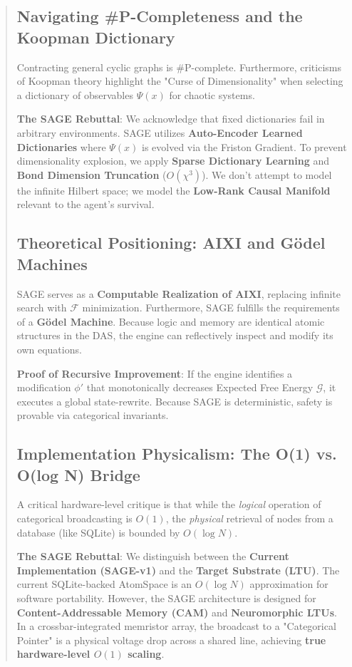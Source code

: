 \documentclass[10pt,twocolumn,letterpaper]{article}
\begin{document}
\begin{abstract}
\subsection{Navigating #P-Completeness and the Koopman Dictionary}
Contracting general cyclic graphs is #P-complete. Furthermore, criticisms of Koopman theory highlight the "Curse of Dimensionality" when selecting a dictionary of observables $\Psi(x)$ for chaotic systems.

\textbf{The SAGE Rebuttal}: We acknowledge that fixed dictionaries fail in arbitrary environments. SAGE utilizes \textbf{Auto-Encoder Learned Dictionaries} where $\Psi(x)$ is evolved via the Friston Gradient. To prevent dimensionality explosion, we apply \textbf{Sparse Dictionary Learning} and \textbf{Bond Dimension Truncation} ($O(\chi^3)$). We don't attempt to model the infinite Hilbert space; we model the \textbf{Low-Rank Causal Manifold} relevant to the agent's survival.

\subsection{Theoretical Positioning: AIXI and Gödel Machines}
SAGE serves as a \textbf{Computable Realization of AIXI}, replacing infinite search with $\mathcal{F}$ minimization. Furthermore, SAGE fulfills the requirements of a \textbf{Gödel Machine}. Because logic and memory are identical atomic structures in the DAS, the engine can reflectively inspect and modify its own equations.

\textbf{Proof of Recursive Improvement}: If the engine identifies a modification $\phi'$ that monotonically decreases Expected Free Energy $\mathcal{G}$, it executes a global state-rewrite. Because SAGE is deterministic, safety is provable via categorical invariants. 

\subsection{Implementation Physicalism: The O(1) vs. O(log N) Bridge}
A critical hardware-level critique is that while the \textit{logical} operation of categorical broadcasting is $O(1)$, the \textit{physical} retrieval of nodes from a database (like SQLite) is bounded by $O(\log N)$.

\textbf{The SAGE Rebuttal}: We distinguish between the \textbf{Current Implementation (SAGE-v1)} and the \textbf{Target Substrate (LTU)}. The current SQLite-backed AtomSpace is an $O(\log N)$ approximation for software portability. However, the SAGE architecture is designed for \textbf{Content-Addressable Memory (CAM)} and \textbf{Neuromorphic LTUs}. In a crossbar-integrated memristor array, the broadcast to a "Categorical Pointer" is a physical voltage drop across a shared line, achieving \textbf{true hardware-level $O(1)$ scaling}.


\end{abstract}
\end{document}
